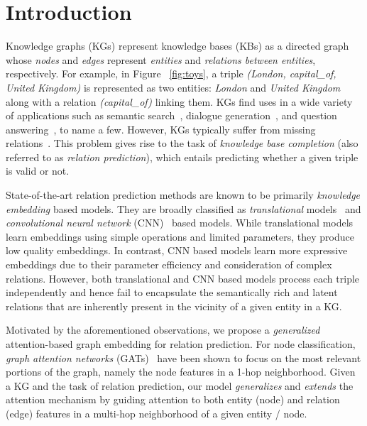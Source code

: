 \documentclass[11pt,a4paper]{article}
\begin{document}
\section{Introduction}
\label{sec:intro}
Knowledge graphs (KGs) represent knowledge bases (KBs) as a directed graph 
whose \emph{nodes} and \emph{edges} represent \emph{entities} and \emph{relations between entities}, respectively.
For example, in Figure ~\ref{fig:toys}, a triple \textit{(London, capital\_of, United Kingdom)} is represented as two entities: \textit{London} and \textit{United Kingdom} along with a relation \textit{(capital\_of)} linking them. 
KGs find uses in a wide variety of applications such as semantic search~\cite{berant2013semantic, berant2014}, dialogue generation~\cite{Hehe2017, keizer2017}, and question answering~\cite{zhang2016question,diefenbach2018wdaqua}, to name a few. However, KGs typically suffer from missing relations~\cite{Socher2013,West_2014}. 
This problem gives rise to the task of \emph{knowledge base completion} (also referred to as \emph{relation prediction}), which entails predicting whether a given triple is valid or not.


State-of-the-art relation prediction methods are known to be primarily \emph{knowledge embedding} based models. They are broadly classified as \emph{translational} models~\cite{NIPS2013_5071,yang2014,trouillon2016complex} and \emph{convolutional neural network} (CNN)~\cite{nguyen2018novel,dettmers2018convolutional} based models. 
While translational models learn embeddings using simple operations  and limited parameters, 
they produce low quality embeddings. 
In contrast, CNN based models learn more expressive embeddings due to their parameter efficiency 
and consideration of complex relations. 
However, both translational and CNN based models process each triple independently and hence fail to encapsulate the semantically rich and latent relations that are inherently present in the vicinity of a given entity in a KG.


Motivated by the aforementioned observations, we propose a \emph{generalized} attention-based graph embedding for relation prediction.
For node classification, \emph{graph attention networks} (GATs)~\cite{velickovic2018graph} have been shown to focus on the most relevant portions of the graph, namely the node features in a 1-hop neighborhood. Given a KG and the task of relation prediction, our model \emph{generalizes} and \emph{extends} the attention mechanism by guiding attention to both entity (node) and relation (edge) features in a multi-hop neighborhood of a given entity / node.
\end{document}
